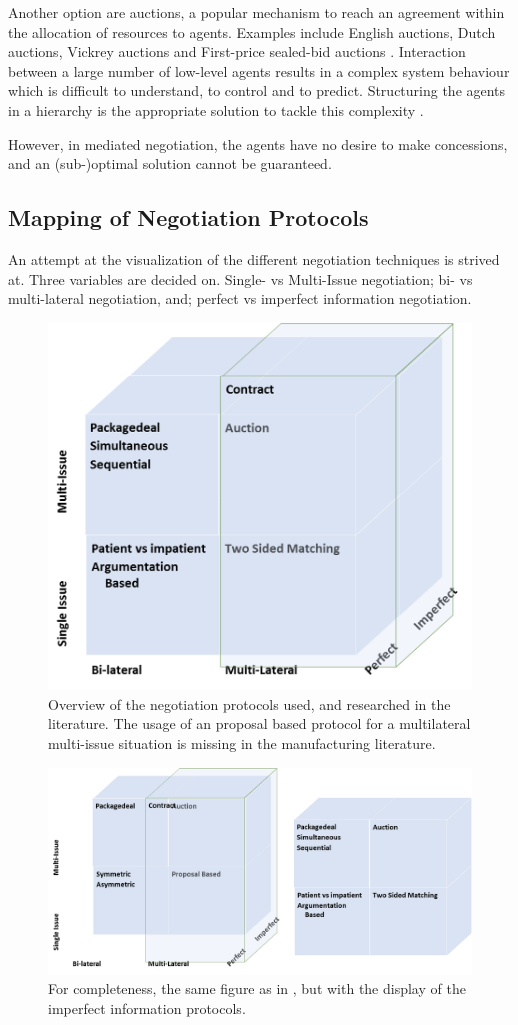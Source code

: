 Another option are auctions, a popular mechanism to reach an agreement within the allocation of resources to agents. Examples include English auctions, Dutch auctions, Vickrey auctions and First-price sealed-bid auctions \citep{wooldridge2009introduction}. Interaction between a large number of low-level agents results in a complex system behaviour which is difficult to understand, to control and to predict. Structuring the agents in a hierarchy is the appropriate solution to tackle this complexity \citep{van1998reference}.

However, in mediated negotiation, the agents have no desire to make concessions, and an (sub-)optimal solution cannot be guaranteed.

\subsection{Mapping of Negotiation Protocols}
An attempt at the visualization of the different negotiation techniques is strived at. Three variables are decided on. Single- vs Multi-Issue negotiation; bi- vs multi-lateral negotiation, and; perfect vs imperfect information negotiation.  
\begin{figure}[h]
	\centering
	\includegraphics[width=0.7\linewidth]{img/mapping_nego}
	\caption{Overview of the negotiation protocols used, and researched in the literature. The usage of an proposal based protocol for a multilateral multi-issue situation is missing in the manufacturing literature.}
	\label{fig:mapping_nego}
\end{figure}


\begin{figure}[h]
	\centering
	\includegraphics[width=0.9\linewidth]{img/mapping_nego2}
	\caption{For completeness, the same figure as in , but with the display of the imperfect information protocols.}
	\label{fig:mapping_nego2}
\end{figure}


